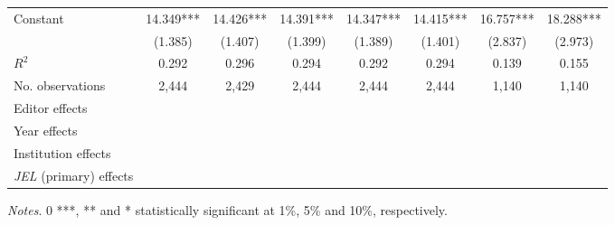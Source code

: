 \begin{table}
\begin{adjustwidth}{-0.085cm}{}
\begin{threeparttable}
\begin{tabular}{p{2.64cm}SSSSSSS}
            Constant                      &      14.349***&      14.426***&      14.391***&      14.347***&      14.415***&      16.757***&      18.288***\\
                                          &     (1.385)   &     (1.407)   &     (1.399)   &     (1.389)   &     (1.401)   &     (2.837)   &     (2.973)   \\
            \midrule
            \(R^2\)                       &       0.292   &       0.296   &       0.294   &       0.292   &       0.294   &       0.139   &       0.155   \\
            No. observations              &       2,444   &       2,429   &       2,444   &       2,444   &       2,444   &       1,140   &       1,140   \\
            \midrule
            Editor effects        &           {}   &           {}   &           {}   &           {}   &           {}   &           {}   &           {}   \\
            Year effects                  &           {}   &           {}   &           {}   &           {}   &           {}   &           {}   &           {}   \\
            Institution effects           &           {}   &           {}   &           {}   &           {}   &           {}   &           {}   &           {}   \\
            \textit{JEL} (primary) effects&               &               &               &               &               &               &           {}   \\
            \bottomrule
        \end{tabular}
        \begin{tablenotes}
            \tiny
            \item \textit{Notes}. 0 ***, ** and * statistically significant at 1\%, 5\% and 10\%, respectively.
        \end{tablenotes}
    \end{threeparttable}
    \end{adjustwidth}
\end{table}